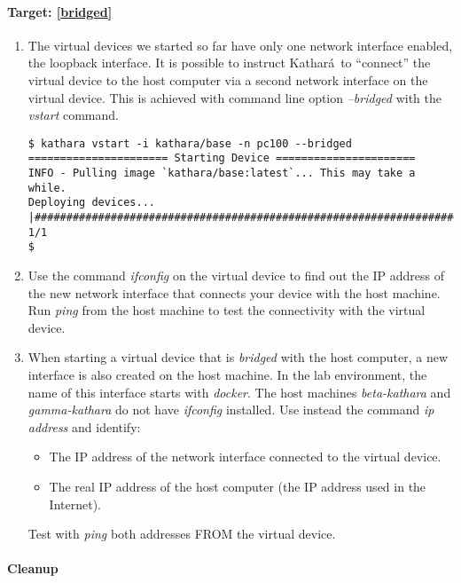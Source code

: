 \documentclass[12pt]{book}
\newcommand{\kathara}{Kathar\'a}
\begin{document}
\paragraph{Target: \ref{bridged}}

\begin{enumerate}[resume*]
\item The virtual devices we started so far have only one network interface enabled, the loopback interface. It is possible to instruct \kathara\ to ``connect'' the virtual device to the host computer via a second network interface on the virtual device. This is achieved with command line option \emph{--bridged} with the \emph{vstart} command.

\begin{lstlisting}
$ kathara vstart -i kathara/base -n pc100 --bridged
====================== Starting Device ======================
INFO - Pulling image `kathara/base:latest`... This may take a while.
Deploying devices... |###############################################################################################| 1/1
$
\end{lstlisting}

\item Use the command \emph{ifconfig} on the virtual device to find out the IP address of the new network interface that connects your device with the host machine. Run \emph{ping} from the host machine to test the connectivity with the virtual device. 

\item When starting a virtual device that is \emph{bridged} with the host computer, a new interface is also created on the host machine. In the lab environment, the name of this interface starts with \emph{docker}. The host machines \emph{beta-kathara} and \emph{gamma-kathara} do not have \emph{ifconfig} installed. Use instead the command \emph{ip address} and identify:
\begin{itemize}[label=-]
\item The IP address of the network interface connected to the virtual device.
\item The real IP address of the host computer (the IP address used in the Internet).
\end{itemize}
Test with \emph{ping} both addresses FROM the virtual device. 
\end{enumerate}

\paragraph{Cleanup}
\end{document}
